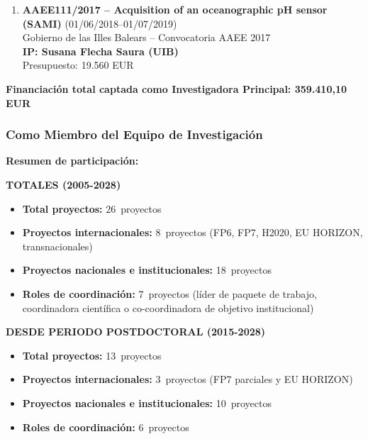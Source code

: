 \documentclass[11pt,a4paper]{article}
\begin{document}
\begin{enumerate}[leftmargin=*]
    \item \textbf{AAEE111/2017 -- Acquisition of an oceanographic pH sensor (SAMI)} (01/06/2018--01/07/2019)\\
    Gobierno de las Illes Balears -- Convocatoria AAEE 2017\\
    \textbf{IP: Susana Flecha Saura (UIB)}\\
    Presupuesto: 19.560 EUR

\end{enumerate}

\textbf{Financiación total captada como Investigadora Principal: 359.410,10 EUR}

\subsubsection{Como Miembro del Equipo de Investigación}

\noindent\textbf{Resumen de participación:}

\begin{minipage}[t]{0.48\textwidth}
\raggedright
\textbf{TOTALES (2005-2028)}
\begin{itemize}[leftmargin=*,label={}]
    \item \textbf{Total proyectos:} 26~proyectos
    \item \textbf{Proyectos internacionales:} 8~proyectos (FP6, FP7, H2020, EU HORIZON, transnacionales)
    \item \textbf{Proyectos nacionales e institucionales:} 18~proyectos
    \item \textbf{Roles de coordinación:} 7~proyectos (líder de paquete de trabajo, coordinadora científica o co-coordinadora de objetivo institucional)
\end{itemize}
\end{minipage}%
\hfill
\begin{minipage}[t]{0.48\textwidth}
\raggedright
\textbf{DESDE PERIODO POSTDOCTORAL (2015-2028)}
\begin{itemize}[leftmargin=*,label={}]
    \item \textbf{Total proyectos:} 13~proyectos
    \item \textbf{Proyectos internacionales:} 3~proyectos (FP7 parciales y EU HORIZON)
    \item \textbf{Proyectos nacionales e institucionales:} 10~proyectos
    \item \textbf{Roles de coordinación:} 6~proyectos
\end{itemize}
\end{minipage}
\end{document}
